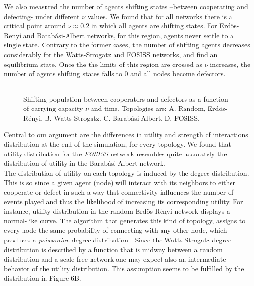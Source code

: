 \documentclass{bmcart}
\def\texttt{[image: ]}
\begin{document}

We also measured the number of agents shifting states --between cooperating and
defecting- under different $\nu$ values. We found that for all networks there is
a critical point around  $\nu \approx 0.2$ in which all agents are shifting
states. For Erd\"{o}s-Reny\'i and Barab\'asi-Albert networks, for this region,
agents never settle to a single state. Contrary to the former cases, the number
of shifting agents decreases considerably for the Watts-Strogatz and FOSISS
networks, and find an equilibrium state. Once the the limits of this region are
crossed as $\nu$ increases, the number of agents shifting states falls to $0$
and all nodes become defectors. \\


\begin{figure} [h!]
\centering
\begin{tabular}{cc}

\end{tabular}
\caption{Shifting population between cooperators and defectors as a function of
carrying capacity $\nu$ and time. Topologies are: A. Random, Erd\"{o}s-R\'enyi. B. Watts-Strogatz. C. Barab\'asi-Albert. D. FOSISS.}\label{state} 
\end{figure}


Central to our argument are the differences in utility and strength of
interactions distribution at the end of the simulation, for every topology. We
found that utility distribution for the \textit{FOSISS} network resembles quite
accurately the distribution of utility in the Barab\'asi-Albert
network.\\ 


The distribution of utility on each topology is induced by the degree
distribution. This is so since a given agent (node) will interact with its
neighbors to either cooperate or defect in such a way that connectivity
influences the number of events played and thus the likelihood of increasing its
corresponding utility. For instance, utility distribution in the random
Erd\"{o}s-R\'enyi network displays a normal-like curve. The algorithm that
generates this kind of topology, assigns to every node the same probability of
connecting with any other node, which produces a \textit{poissonian} degree
distribution \cite{ErdosRenyi:59}. Since the Watts-Strogatz degree distribution is
described by a function that is midway between a random distribution and a
scale-free network \cite{Barratmodels:2000} one may expect also  an intermediate
behavior of the utility distribution. This assumption seems to be fulfilled by
the distribution in Figure 6B. \\
\end{document}
